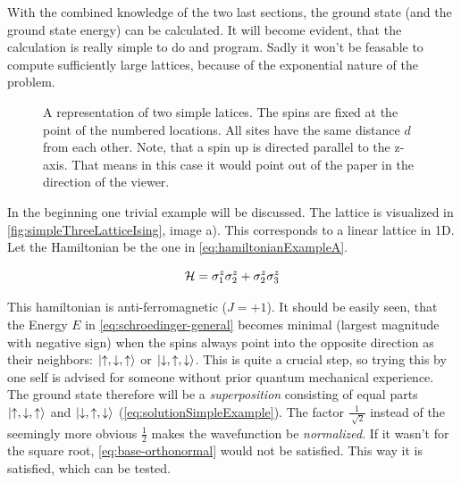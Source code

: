 With the combined knowledge of the two last sections, the ground state (and the ground state energy) can be calculated. It will become evident, that the calculation is really simple to do and program. Sadly it won't be feasable to compute sufficiently large lattices, because of the exponential nature of the problem.

\begin{figure}[htbp]
    \centering
    \vspace{-1cm}
    \caption{A representation of two simple latices. The spins are fixed at the point of the numbered locations. All sites have the same distance $d$ from each other. Note, that a spin up \up is directed parallel to the z-axis. That means in this case it would point out of the paper in the direction of the viewer.}
    \label{fig:simpleThreeLatticeIsing}
\end{figure}

In the beginning one trivial example will be discussed. The lattice is visualized in \autoref{fig:simpleThreeLatticeIsing}, image a).
This corresponds to a linear lattice in 1D. Let the Hamiltonian be the one in \autoref{eq:hamiltonianExampleA}.

\begin{equation}
    \label{eq:hamiltonianExampleA}
    \mathcal{H} = \sigma^z_1\sigma^z_2 + \sigma^z_2\sigma^z_3
\end{equation}

This hamiltonian is anti-ferromagnetic ($J = +1$). It should be easily seen, that the Energy $E$ in \autoref{eq:schroedinger-general} becomes minimal (largest magnitude with negative sign) when the spins always point into the opposite direction as their neighbors: $\ket{\uparrow, \downarrow, \uparrow}$ or $\ket{\downarrow, \uparrow, \downarrow}$. This is quite a crucial step, so trying this by one self is advised for someone without prior quantum mechanical experience.
The ground state therefore will be a \emph{superposition} consisting of equal parts $\ket{\uparrow, \downarrow, \uparrow}$ and $\ket{\downarrow, \uparrow, \downarrow}$ (\autoref{eq:solutionSimpleExample}). The factor $\frac{1}{\sqrt[]{2}}$ instead of the seemingly more obvious $\frac{1}{2}$ makes the wavefunction be \emph{normalized}. If it wasn't for the square root, \autoref{eq:base-orthonormal} would not be satisfied. This way it is satisfied, which can be tested.

